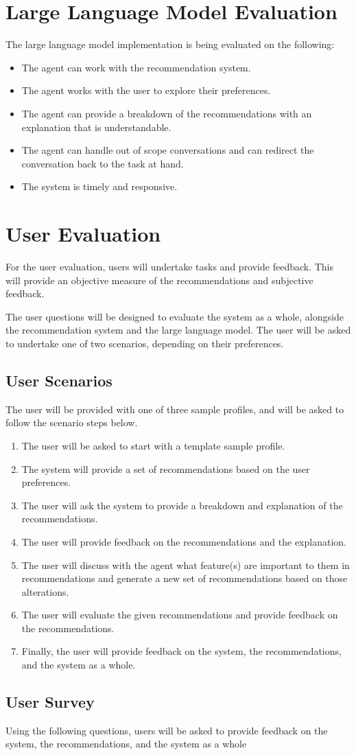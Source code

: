 \section{Large Language Model Evaluation}
\label{sec:large_language_model_evaluation}
The large language model implementation is being evaluated on the following:
\begin{itemize}
    \item The agent can work with the recommendation system.
    \item The agent works with the user to explore their preferences.
    \item The agent can provide a breakdown of the recommendations with an explanation that is understandable.
    \item The agent can handle out of scope conversations and can redirect the conversation back to the task at hand.
    \item The system is timely and responsive.
\end{itemize}


\section{User Evaluation}
\label{sec:user_evaluation}
For the user evaluation, users will undertake tasks and provide feedback. This will provide an objective measure of the recommendations and subjective feedback.

The user questions will be designed to evaluate the system as a whole, alongside the recommendation system and the large language model.
The user will be asked to undertake one of two scenarios, depending on their preferences.

\subsection{User Scenarios}
\label{sec:user_scenarios}
The user will be provided with one of three sample profiles, and will be asked to follow the scenario steps below.
\begin{enumerate}
    \item The user will be asked to start with a template sample profile.
    \item The system will provide a set of recommendations based on the user preferences.
    \item The user will ask the system to provide a breakdown and explanation of the recommendations.
    \item The user will provide feedback on the recommendations and the explanation.
    \item The user will discuss with the agent what feature(s) are important to them in recommendations and generate a new set of recommendations based on those alterations.
    \item The user will evaluate the given recommendations and provide feedback on the recommendations.
    \item Finally, the user will provide feedback on the system, the recommendations, and the system as a whole.
\end{enumerate}


\subsection{User Survey}
\label{sec:user_survey}
Using the following questions, users will be asked to provide feedback on the system, the recommendations, and the system as a whole


